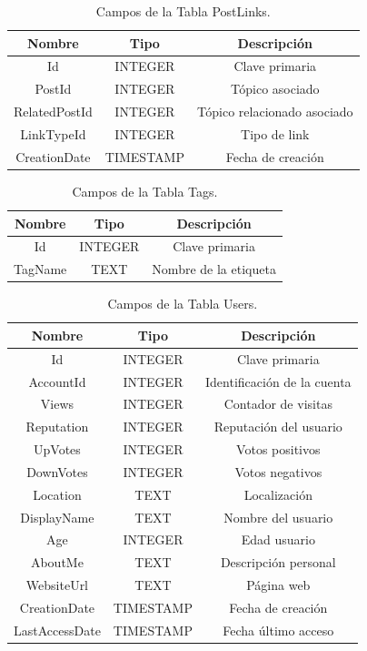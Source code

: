 \begin{table}[h]
\caption{Campos de la Tabla PostLinks.}
\centering
\begin{tabular}{ccc}
\hline
Nombre & Tipo & Descripción \\
\hline
Id & INTEGER & Clave primaria \\
PostId & INTEGER & Tópico asociado \\
RelatedPostId & INTEGER & Tópico relacionado asociado \\
LinkTypeId & INTEGER & Tipo de link \\
CreationDate & TIMESTAMP & Fecha de creación \\
\hline
\end{tabular}
\end{table}

\begin{table}[h]
\caption{Campos de la Tabla Tags.}
\centering
\begin{tabular}{ccc}
\hline
Nombre & Tipo & Descripción \\
\hline
Id & INTEGER & Clave primaria \\
TagName & TEXT & Nombre de la etiqueta \\
\hline
\end{tabular}
\end{table}

\begin{table}[h]
\caption{Campos de la Tabla Users.}
\centering
\begin{tabular}{ccc}
\hline
Nombre & Tipo & Descripción \\
\hline
Id & INTEGER & Clave primaria \\
AccountId & INTEGER & Identificación de la cuenta \\
Views & INTEGER & Contador de visitas \\
Reputation & INTEGER & Reputación del usuario \\
UpVotes & INTEGER & Votos positivos \\
DownVotes & INTEGER & Votos negativos \\
Location & TEXT & Localización \\
DisplayName & TEXT & Nombre del usuario \\
Age & INTEGER & Edad usuario \\
AboutMe & TEXT & Descripción personal \\
WebsiteUrl & TEXT & Página web \\
CreationDate & TIMESTAMP & Fecha de creación\\
LastAccessDate & TIMESTAMP & Fecha último acceso \\
\hline
\end{tabular}
\end{table}

